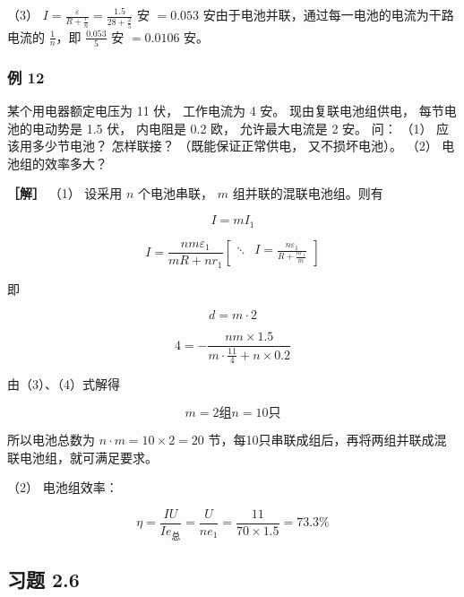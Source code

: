 （3）
\(I = \frac{\varepsilon}{R + \frac{r}{n}} = \frac{1.5}{28 + \frac{2}{5}}\)
安 \(= 0.053\) 安由于电池并联，通过每一电池的电流为干路电流的
\(\frac{1}{n}\)，即 \(\frac{0.053}{5}\) 安 \(= 0.0106\) 安。

\subsubsection{例 12}\label{ux4f8b-12-1}

某个用电器额定电压为 11 伏， 工作电流为 4 安。 现由复联电池组供电，
每节电池的电动势是 1.5 伏， 内电阻是 0.2 欧， 允许最大电流是 2 安。 问：
（1） 应该用多少节电池？ 怎样联接？ （既能保证正常供电，
又不损坏电池）。 （2） 电池组的效率多大？

\textbf{［解］} （1） 设采用 \(n\) 个电池串联， \(m\)
组并联的混联电池组。则有

\[
I = m I_{1} \tag{1}
\]

\[
I = \frac{n m \varepsilon_{1}}{m R + n r_{1}} \left[ \begin{array}{cc} \ddots & I = \frac{n \varepsilon_{1}}{R + \frac{n r_{1}}{m}} \end{array} \right] \tag{2}
\]

即

\[
d = m \cdot 2 \tag{3}
\]

\[
4 = - \frac{n m \times 1.5}{m \cdot \frac{11}{4} + n \times 0.2} \tag{4}
\]

由（3）、（4）式解得

\[
m = 2 \text{组} n = 10 \text{只}
\]

所以电池总数为 \(n \cdot m = 10 \times 2 = 20\)
节，每10只串联成组后，再将两组并联成混联电池组，就可满足要求。

（2） 电池组效率：

\[
\eta = \frac{I U}{I e_{\mathrm{总}}} = \frac{U}{n e_{1}} = \frac{11}{70 \times 1.5} = 73.3 \%
\]

\subsection{习题 2.6}\label{ux4e60ux9898-2.6}

